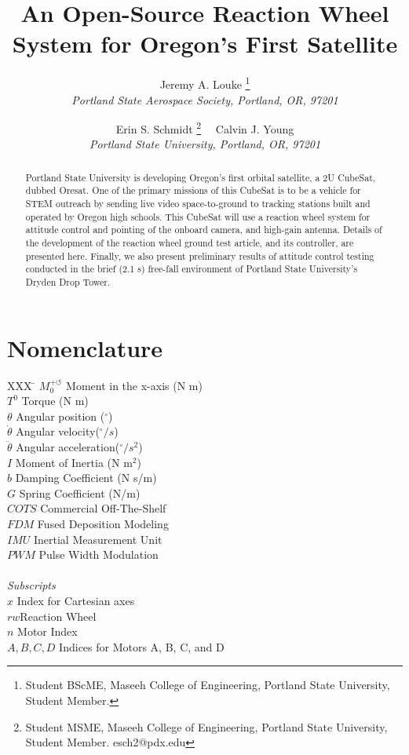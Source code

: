 \documentclass[]{aiaa-tc}%
\title{An Open-Source Reaction Wheel System for Oregon's First Satellite}
\author{
  Jeremy A. Louke%
  	\thanks{Student BScME, Maseeh College of Engineering, Portland State University, Student Member.}\\
  {\normalsize\itshape
   Portland State Aerospace Society, Portland, OR, 97201}\\
  \and
  Erin S. Schmidt%
  	\thanks{Student MSME, Maseeh College of Engineering, Portland State University, Student Member. esch2@pdx.edu} \ \
  Calvin J. Young\thanksibid{1}\\
  {\normalsize\itshape
  Portland State University, Portland, OR, 97201}
 }
\begin{document}
\maketitle

\begin{abstract}
Portland State University is developing Oregon's first orbital satellite, a 2U CubeSat, dubbed Oresat. One of the primary missions of this CubeSat is to be a vehicle for STEM outreach by sending live video space-to-ground to tracking stations built and operated by Oregon high schools. This CubeSat will use a reaction wheel system for attitude control and pointing of the onboard camera, and high-gain antenna. Details of the development of the reaction wheel ground test article, and its controller, are presented here. Finally, we also present preliminary results of attitude control testing conducted in the brief (2.1 s) free-fall environment of Portland State University's Dryden Drop Tower. 
\end{abstract}

\section*{Nomenclature}

\begin{center}
\parbox{0cm}
{\begin{tabbing}
  XXX \= \kill%
  $M_0^{+ \circlearrowleft}$ \qquad Moment in the x-axis (N m)\\
  $T^0$ \qquad Torque (N m)\\
  $\theta$ \qquad Angular position (${}^{\circ}$)\\
  $\dot{\theta}$ \qquad Angular velocity(${}^{\circ}/s$)\\ 
  $\ddot{\theta}$ \qquad Angular acceleration(${}^{\circ}/s^2$) \\
  $I$ \qquad Moment of Inertia (N $\textrm{m}^2$)\\
  $b$ \qquad Damping Coefficient (N s/m)\\ 
  $G$ \qquad Spring Coefficient (N/m)\\
  $COTS$ \qquad Commercial Off-The-Shelf\\
  $FDM$ \qquad Fused Deposition Modeling\\
  $IMU$ \qquad Inertial Measurement Unit\\
  $PWM$ \qquad Pulse Width Modulation\\ \\
  \textit{Subscripts}\\
  $x$ \qquad Index for Cartesian axes \\
  $rw$\qquad Reaction Wheel\\
  $n$ \qquad Motor Index\\
  $A, B, C, D$ \qquad Indices for Motors A, B, C, and D\\
 \end{tabbing}}
 \end{center}
 
\end{document}
